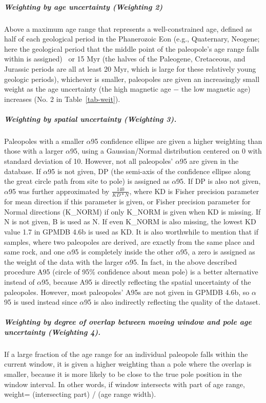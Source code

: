 \subparagraph{Weighting by age uncertainty (Weighting 2)} Above a maximum age
range that represents a well-constrained age, defined as half of each geological
period in the Phanerozoic Eon (e.g., Quaternary, Neogene; here the geological
period that the middle point of the paleopole's age range falls within is
assigned)~\cite{v90,T19} or 15 Myr (the halves of the Paleogene, Cretaceous, and
Jurassic periods are all at least 20 Myr, which is large for these relatively
young geologic periods), whichever is smaller, paleopoles are given an
increasingly small weight as the age uncertainty (the high magnetic age $-$ the
low magnetic age) increases (No. 2 in Table~\ref{tab-weit}).

\subparagraph{Weighting by spatial uncertainty (Weighting 3).} Paleopoles with a
smaller $\alpha$95 confidence ellipse are given a higher weighting than those
with a larger $\alpha$95, using a Gaussian/Normal distribution centered on 0
with standard deviation of 10. However, not all paleopoles' $\alpha$95 are given
in the database. If $\alpha$95 is not given, DP (the semi-axis of the confidence
ellipse along the great circle path from site to pole) is assigned as
$\alpha$95. If DP is also not given, $\alpha$95 was further approximated by
$\frac{140}{KD*N}$, where KD is Fisher precision parameter for mean direction if
this parameter is given, or Fisher precision parameter for Normal directions
(K\_NORM) if only K\_NORM is given when KD is missing. If N is not given, B is
used as N. If even K\_NORM is also missing, the lowest KD value 1.7 in GPMDB
4.6b is used as KD\@. It is also worthwhile to mention that if samples, where
two paleopoles are derived, are exactly from the same place and same rock, and
one $\alpha$95 is completely inside the other $\alpha$95, a zero is assigned as
the weight of the data with the larger $\alpha$95. In fact, in the above
described procedure A95 (circle of 95\% confidence about mean pole) is a better
alternative instead of $\alpha$95, because A95 is directly reflecting the
spatial uncertainty of the paleopoles. However, most paleopoles' A95s are not
given in GPMDB 4.6b, so $\alpha$95 is used instead since $\alpha$95 is also
indirectly reflecting the quality of the dataset.

\subparagraph{Weighting by degree of overlap between moving window and pole age
uncertainty (Weighting 4).} If a large fraction of the age range for an
individual paleopole falls within the current window, it is given a higher
weighting than a pole where the overlap is smaller, because it is more likely
to be close to the true pole position in the window interval. In other words, if
window intersects with part of age range, weight= (intersecting part) / (age
range width).

